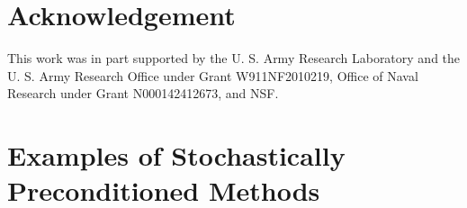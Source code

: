 \documentclass{article}
\theoremstyle{plain}
\theoremstyle{definition}
\theoremstyle{remark}
\begin{document}

\section*{Acknowledgement}
This work was in part supported by the U. S. Army Research Laboratory and the U. S. Army Research Office under Grant W911NF2010219, Office of Naval Research under Grant N000142412673, and NSF.






\nocite{langley00}

%


\newpage
\appendix
\onecolumn
\section{Examples of Stochastically Preconditioned Methods}\label{appendix:table}
\end{document}
